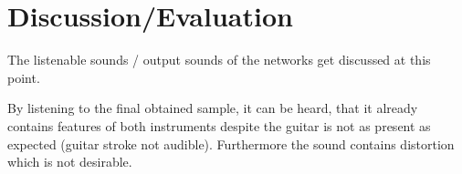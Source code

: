 \chapter{Discussion/Evaluation}
\label{cha:Discussion}


The listenable sounds / output sounds of the networks get discussed at this point.

By listening to the final obtained sample, it can be heard, that it already contains features of both instruments despite the guitar is not as present as expected (guitar stroke not audible). Furthermore the sound contains distortion which is not desirable.